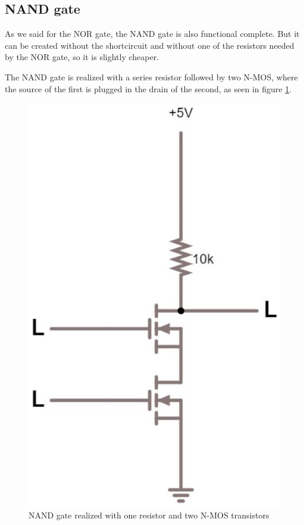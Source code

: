\documentclass{article}
\begin{document}
\subsection{NAND gate}

As we said for the NOR gate, the NAND gate is also functional complete. But it can be created without the shortcircuit and without one of the resistors needed by the NOR gate, so it is slightly cheaper. 

\vspace{3mm}

The NAND gate is realized with a series resistor followed by two N-MOS, where the source of the first is plugged in the drain of the second, as seen in figure \ref{NAND_NMOS}.

\begin{figure}[h]
    \centering
    \includegraphics[scale=.25]{IM_NAND_NMOS.JPG}
    \caption{NAND gate realized with one resistor and two N-MOS transistors}
    \label{NAND_NMOS}
\end{figure}
\end{document}
